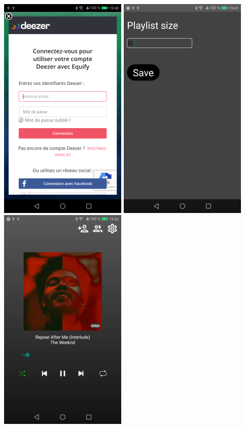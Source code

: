 \documentclass[12pt, openany]{report}
\begin{document}
\\
\includegraphics[scale=0.7]{images/deezer-login.png}
\includegraphics[scale=0.7]{images/setting-page.png}
\\
\includegraphics[scale=0.7]{images/media-player-page.png}
\end{document}
